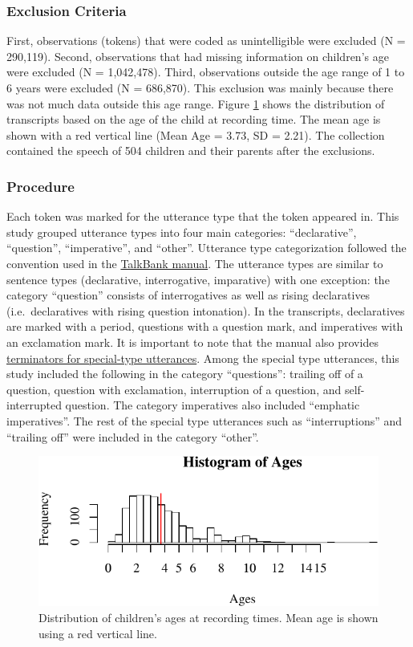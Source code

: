 \documentclass[oneside]{report}
\theoremstyle{definition}
\theoremstyle{definition}
\theoremstyle{definition}
\theoremstyle{remark}
\begin{document}
\subsubsection{Exclusion Criteria}\label{exclusion-criteria}

First, observations (tokens) that were coded as unintelligible were
excluded (N = 290,119). Second, observations that had missing
information on children's age were excluded (N = 1,042,478). Third,
observations outside the age range of 1 to 6 years were excluded (N =
686,870). This exclusion was mainly because there was not much data
outside this age range. Figure \ref{fig:ageDistPlot} shows the
distribution of transcripts based on the age of the child at recording
time. The mean age is shown with a red vertical line (Mean Age = 3.73,
SD = 2.21). The collection contained the speech of 504 children and
their parents after the exclusions.

\subsubsection{Procedure}\label{procedure}

Each token was marked for the utterance type that the token appeared in.
This study grouped utterance types into four main categories:
``declarative'', ``question'', ``imperative'', and ``other''. Utterance
type categorization followed the convention used in the
\href{https://talkbank.org/manuals/CHAT.html\#_Toc486414422}{TalkBank
manual}. The utterance types are similar to sentence types (declarative,
interrogative, imparative) with one exception: the category ``question''
consists of interrogatives as well as rising declaratives
(i.e.~declaratives with rising question intonation). In the transcripts,
declaratives are marked with a period, questions with a question mark,
and imperatives with an exclamation mark. It is important to note that
the manual also provides
\href{https://talkbank.org/manuals/CHAT.html\#_Toc486414431}{terminators
for special-type utterances}. Among the special type utterances, this
study included the following in the category ``questions'': trailing off
of a question, question with exclamation, interruption of a question,
and self-interrupted question. The category imperatives also included
``emphatic imperatives''. The rest of the special type utterances such
as ``interruptions'' and ``trailing off'' were included in the category
``other''.
\begin{figure}
\centering
\includegraphics{figs/ageDistPlot-1.pdf}
\caption{\label{fig:ageDistPlot}Distribution of children's ages at recording
times. Mean age is shown using a red vertical line.}
\end{figure}
\end{document}
